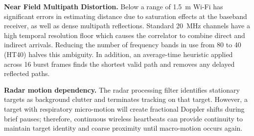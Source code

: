 \textbf{Near Field Multipath Distortion.} Below a range of 1.5~m Wi-Fi has significant errors in estimating distance due to saturation effects at the baseband receiver, as well as dense multipath reflections. Standard 20~MHz channels have a high temporal resolution floor which causes the correlator to combine direct and indirect arrivals. Reducing the number of frequency bands in use from 80 to 40 (HT40) halves this ambiguity. In addition, an average-time heuristic applied across 16 burst frames finds the shortest valid path and removes any delayed reflected paths.

\textbf{Radar motion dependency.} The radar processing filter identifies stationary targets as background clutter and terminates tracking on that target. However, a target with respiratory micro-motion will create fractional Doppler shifts during brief pauses; therefore, continuous wireless heartbeats can provide continuity to maintain target identity and coarse proximity until macro-motion occurs again.
